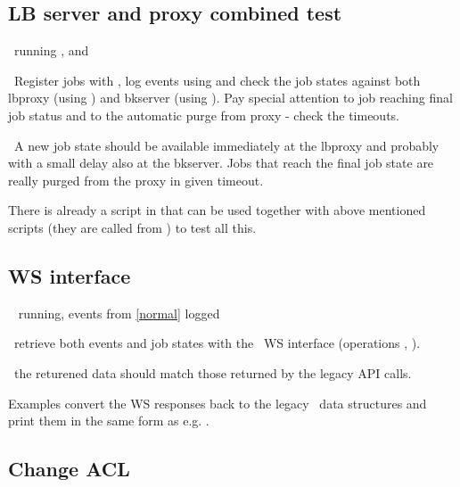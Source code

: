 \subsection{LB server and proxy combined test}

\req\ running ,  and

\what\ Register jobs with , log events
using  and check the job states against
both lbproxy (using ) and bkserver
(using ). Pay special attention to job reaching final 
job status and to the automatic purge from proxy - check the timeouts.

\result\ A new job state should be available immediately at the
lbproxy and probably with a small delay also at the bkserver. Jobs that reach the final job state
are really purged from the proxy in given timeout.

\begin{hints}
There is already a script  in
 that can be used together with
above mentioned scripts  (they are called from
) to test all this.
\end{hints}



\subsection{WS interface}
\req\  running, events from \ref{normal} logged

\how\ retrieve both events and job states with the \LB\ WS interface
(operations , ).

\result\ the returened data should match those returned by the legacy
API calls.

\begin{hints}
Examples  convert the WS
responses back to the legacy \LB\ data structures and print them in
the same form as e.g. .
\end{hints}



\subsection{Change ACL}




